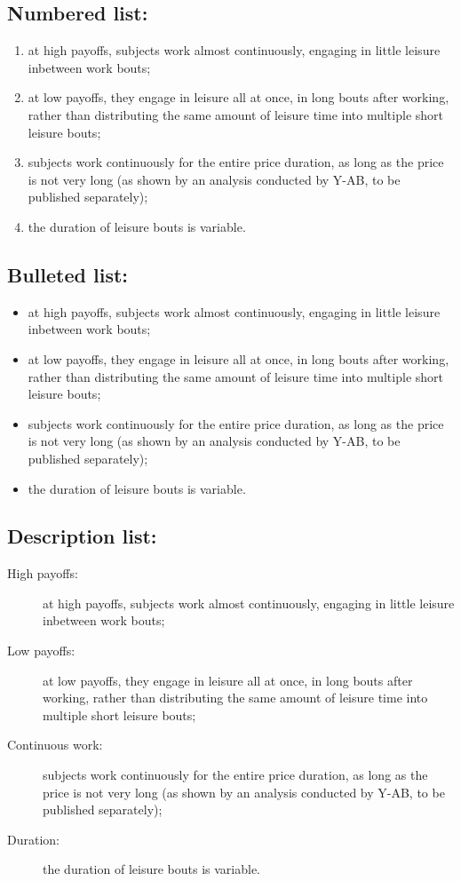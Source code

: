 \documentclass[NETN]{stjour}
\begin{document}
\subsection{Numbered list:}

\begin{enumerate}
\item at high 
payoffs, subjects work almost continuously, engaging in little leisure
inbetween work bouts; 
\item at low payoffs, they 
engage in leisure all at once, in long bouts after working, rather
than distributing the same amount of leisure time into multiple short
leisure bouts; 
\item subjects work continuously for the entire price duration, as long as
the price is not very long (as shown by an analysis conducted by
Y-AB, to be published separately);  
\item the duration of leisure bouts is variable.
\end{enumerate}


\subsection{Bulleted list:}

\begin{itemize}
\item at high 
payoffs, subjects work almost continuously, engaging in little leisure
inbetween work bouts; 
\item at low payoffs, they 
engage in leisure all at once, in long bouts after working, rather
than distributing the same amount of leisure time into multiple short
leisure bouts; 
\item subjects work continuously for the entire price duration, as long as
the price is not very long (as shown by an analysis conducted by
Y-AB, to be published separately);  
\item the duration of leisure bouts is variable.
\end{itemize}

\subsection{Description list:}
\begin{description}
\item[High payoffs:] at high 
payoffs, subjects work almost continuously, engaging in little leisure
inbetween work bouts; 
\item[Low payoffs:] at low payoffs, they 
engage in leisure all at once, in long bouts after working, rather
than distributing the same amount of leisure time into multiple short
leisure bouts; 
\item[Continuous work:] subjects work continuously for the entire price duration, as long as
the price is not very long (as shown by an analysis conducted by Y-AB, to be published separately); 
\item[Duration:] the duration of leisure bouts is variable.
\end{description}
\end{document}
